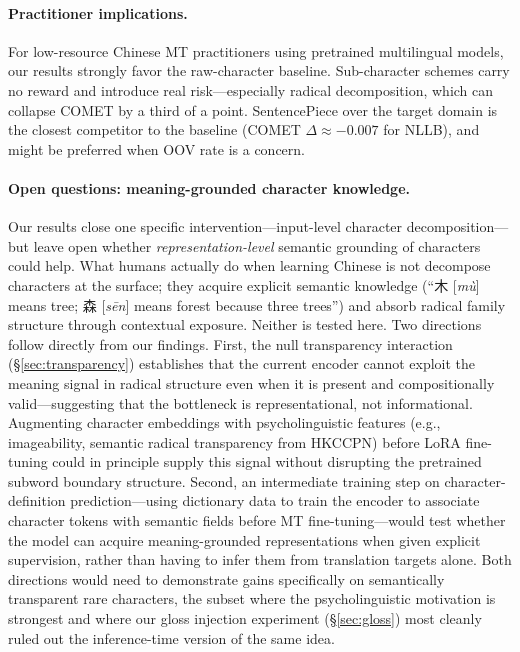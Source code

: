 \documentclass[11pt]{article}
\begin{document}
\paragraph{Practitioner implications.}
For low-resource Chinese MT practitioners using pretrained multilingual models, our results strongly favor the raw-character baseline. Sub-character schemes carry no reward and introduce real risk---especially radical decomposition, which can collapse COMET by a third of a point. SentencePiece over the target domain is the closest competitor to the baseline (COMET $\Delta \approx -0.007$ for NLLB), and might be preferred when OOV rate is a concern.

\paragraph{Open questions: meaning-grounded character knowledge.}
Our results close one specific intervention---input-level character decomposition---but leave open whether \textit{representation-level} semantic grounding of characters could help. What humans actually do when learning Chinese is not decompose characters at the surface; they acquire explicit semantic knowledge (``木 [\textit{mù}] means tree; 森 [\textit{sēn}] means forest because three trees'') and absorb radical family structure through contextual exposure. Neither is tested here. Two directions follow directly from our findings. First, the null transparency interaction (\S\ref{sec:transparency}) establishes that the current encoder cannot exploit the meaning signal in radical structure even when it is present and compositionally valid---suggesting that the bottleneck is representational, not informational. Augmenting character embeddings with psycholinguistic features (e.g., imageability, semantic radical transparency from HKCCPN) before LoRA fine-tuning could in principle supply this signal without disrupting the pretrained subword boundary structure. Second, an intermediate training step on character-definition prediction---using dictionary data to train the encoder to associate character tokens with semantic fields before MT fine-tuning---would test whether the model can acquire meaning-grounded representations when given explicit supervision, rather than having to infer them from translation targets alone. Both directions would need to demonstrate gains specifically on semantically transparent rare characters, the subset where the psycholinguistic motivation is strongest and where our gloss injection experiment (\S\ref{sec:gloss}) most cleanly ruled out the inference-time version of the same idea.
\end{document}
